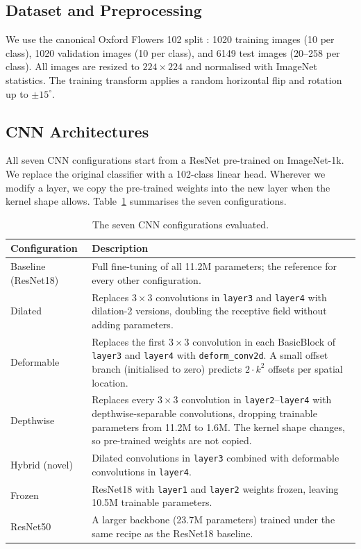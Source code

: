 \subsection{Dataset and Preprocessing}

We use the canonical Oxford Flowers 102 split \citep{nilsback2008}: 1020 training images (10 per class), 1020 validation images (10 per class), and 6149 test images (20--258 per class). All images are resized to $224 \times 224$ and normalised with ImageNet statistics. The training transform applies a random horizontal flip and rotation up to $\pm 15^\circ$.

\subsection{CNN Architectures}

All seven CNN configurations start from a ResNet pre-trained on ImageNet-1k. We replace the original classifier with a 102-class linear head. Wherever we modify a layer, we copy the pre-trained weights into the new layer when the kernel shape allows. Table~\ref{tab:cnn-arch} summarises the seven configurations.

\begin{table}[H]
\centering
\small
\begin{tabular}{p{2.5cm}p{11cm}}
\toprule
Configuration & Description \\
\midrule
Baseline (ResNet18) & Full fine-tuning of all 11.2M parameters; the reference for every other configuration. \\
Dilated & Replaces $3 \times 3$ convolutions in \texttt{layer3} and \texttt{layer4} with dilation-2 versions, doubling the receptive field without adding parameters. \\
Deformable & Replaces the first $3 \times 3$ convolution in each BasicBlock of \texttt{layer3} and \texttt{layer4} with \texttt{deform\_conv2d}. A small offset branch (initialised to zero) predicts $2 \cdot k^2$ offsets per spatial location. \\
Depthwise & Replaces every $3 \times 3$ convolution in \texttt{layer2}--\texttt{layer4} with depthwise-separable convolutions, dropping trainable parameters from 11.2M to 1.6M. The kernel shape changes, so pre-trained weights are not copied. \\
Hybrid (novel) & Dilated convolutions in \texttt{layer3} combined with deformable convolutions in \texttt{layer4}. \\
Frozen & ResNet18 with \texttt{layer1} and \texttt{layer2} weights frozen, leaving 10.5M trainable parameters. \\
ResNet50 & A larger backbone (23.7M parameters) trained under the same recipe as the ResNet18 baseline. \\
\bottomrule
\end{tabular}
\caption{The seven CNN configurations evaluated.}
\label{tab:cnn-arch}
\end{table}

